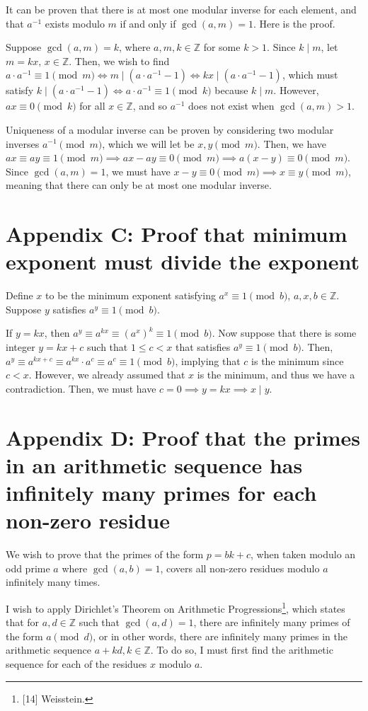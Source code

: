 \documentclass{article}
\newcommand{\Z}{\mathbb{Z}}
\begin{document}
It can be proven that there is at most one modular inverse for each element, and that $a^{-1}$ exists modulo $m$ if and only if $\gcd(a,m) = 1$. Here is the proof.

Suppose $\gcd(a,m)=k$, where $a, m, k \in \Z$ for some $k>1$. Since $k \mid m$, let $m = kx, \hspace{2pt} x \in \Z$. Then, we wish to find $a \cdot a^{-1} \equiv 1 \pmod m \iff m \mid (a \cdot a^{-1} - 1) \iff kx \mid (a \cdot a^{-1}-1)$, which must satisfy $k \mid (a \cdot a^{-1} - 1) \iff a \cdot a^{-1} \equiv 1 \pmod k$ because $k \mid m$. However, $ax \equiv 0 \pmod k$ for all $x \in \Z$, and so $a^{-1}$ does not exist when $\gcd(a,m) > 1$.

Uniqueness of a modular inverse can be proven by considering two modular inverses $a^{-1} \pmod m$, which we will let be $x, y \pmod m$. Then, we have $ax \equiv ay \equiv 1 \pmod m \implies ax-ay \equiv 0 \pmod m \implies a(x-y) \equiv 0 \pmod m$. Since $\gcd(a, m) = 1$, we must have $x-y \equiv 0 \pmod m \implies x \equiv y \pmod m$, meaning that there can only be at most one modular inverse. \qedsymbol
\newpage
\section{Appendix C: Proof that minimum exponent must divide the exponent}
Define $x$ to be the minimum exponent satisfying $a^x \equiv 1 \pmod b$, $a, x, b \in \Z$. Suppose $y$ satisfies $a^y \equiv 1 \pmod b$.

If $y=kx$, then $a^y \equiv a^{kx} \equiv (a^x)^k \equiv 1 \pmod b$. Now suppose that there is some integer $y=kx+c$ such that $1 \le c < x$ that satisfies $a^y \equiv 1 \pmod b$. Then, $a^y \equiv a^{kx+c} \equiv a^{kx} \cdot a^{c} \equiv a^c \equiv 1 \pmod b$, implying that $c$ is the minimum since $c<x$. However, we already assumed that $x$ is the minimum, and thus we have a contradiction. Then, we must have $c=0 \implies y = kx \implies x \mid y$. \qedsymbol
\newpage
\section{Appendix D: Proof that the primes in an arithmetic sequence has infinitely many primes for each non-zero residue}
We wish to prove that the primes of the form $p=bk+c$, when taken modulo an odd prime $a$ where $\gcd(a,b)=1$, covers all non-zero residues modulo $a$ infinitely many times.

I wish to apply Dirichlet's Theorem on Arithmetic Progressions\footnote{[14] Weisstein.}, which states that for $a, d \in \Z$ such that $\gcd(a,d) = 1$, there are infinitely many primes of the form $a \pmod d$, or in other words, there are infinitely many primes in the arithmetic sequence $a+kd, k \in \Z$. To do so, I must first find the arithmetic sequence for each of the residues $x$ modulo $a$.
\end{document}
